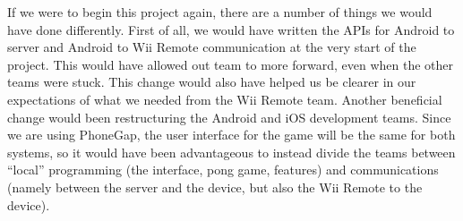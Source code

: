 \documentclass[12pt]{article}
\begin{document}
If we were to begin this project again, there are a number of things we would have done differently.  First of all, we would have written the APIs for Android to server and Android to Wii Remote communication at the very start of the project.  This would have allowed out team to more forward, even when the other teams were stuck.  This change would also have helped us be clearer in our expectations of what we needed from the Wii Remote team.  Another beneficial change would been restructuring the Android and iOS development teams.  Since we are using PhoneGap, the user interface for the game will be the same for both systems, so it would have been advantageous to instead divide the teams between “local” programming (the interface, pong game, features) and communications (namely between the server and the device, but also the Wii Remote to the device). 
\end{document}
